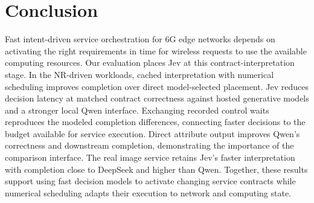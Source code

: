 \section{Conclusion}
Fast intent-driven service orchestration for 6G edge networks depends on activating the right requirements in time for wireless requests to use the available computing resources. Our evaluation places Jev at this contract-interpretation stage. In the NR-driven workloads, cached interpretation with numerical scheduling improves completion over direct model-selected placement. Jev reduces decision latency at matched contract correctness against hosted generative models and a stronger local Qwen interface. Exchanging recorded control waits reproduces the modeled completion differences, connecting faster decisions to the budget available for service execution. Direct attribute output improves Qwen's correctness and downstream completion, demonstrating the importance of the comparison interface. The real image service retains Jev's faster interpretation with completion close to DeepSeek and higher than Qwen. Together, these results support using fast decision models to activate changing service contracts while numerical scheduling adapts their execution to network and computing state.
